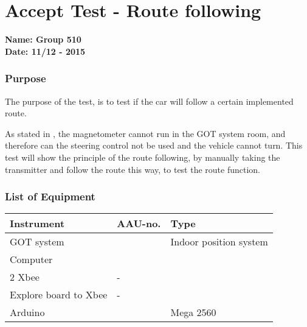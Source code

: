 \pagebreak
\section{Accept Test - Route following} \label{app:AccTes2}
\textbf{Name: Group 510}\\
\textbf{Date: 11/12 - 2015}

\subsubsection{Purpose}
The purpose of the test, is to test if the car will follow a certain implemented route.

As stated in \secref{} , the magnetometer cannot run in the GOT system room, and therefore can the steering control not be used and the vehicle cannot turn. This test will show the principle of the route following, by manually taking the transmitter and follow the route this way, to test the route function.

\subsubsection{List of Equipment}
\begin{table}[H]
\begin{tabular}{|l|l|p{4cm}|}
\hline%
  \textbf{Instrument}                        &  \textbf{AAU-no.}  &  \textbf{Type}       \\
\hline%
  GOT system                               &   &  Indoor position system  \\
\hline%
  Computer                   		         &   &    \\
\hline%
  2 Xbee &  -             &    \\
\hline%
  Explore board to Xbee                 &  -             &                      \\
\hline
 Arduino & & Mega 2560 \\
\hline
\end{tabular}
\end{table}

